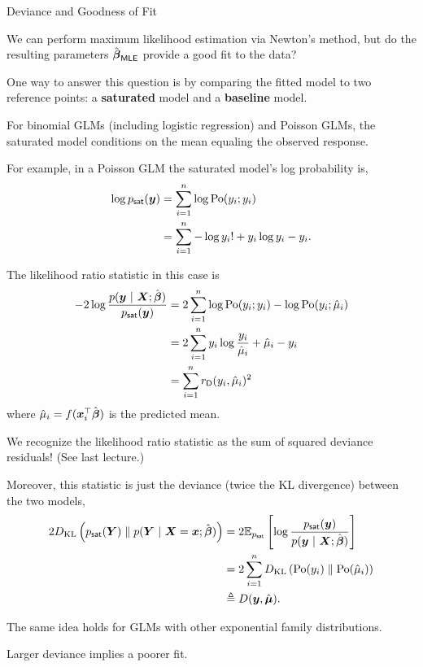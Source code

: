 \documentclass[aspectratio=169]{beamer}
\begin{document}
\begin{frame}[t,allowframebreaks]{Deviance and Goodness of
Fit}\label{deviance-and-goodness-of-fit}

We can perform maximum likelihood estimation via Newton's method, but do
the resulting parameters \(\hat{\boldsymbol{\beta}}_{\mathsf{MLE}}\) provide a good
fit to the data? 

One way to answer this question is by comparing the
fitted model to two reference points: a \textbf{saturated} model and a
\textbf{baseline} model.

For binomial GLMs (including logistic regression) and Poisson GLMs, the
saturated model conditions on the mean equaling the observed response.

For example, in a Poisson GLM the saturated model's log probability is,
\begin{align*}
\log p_{\mathsf{sat}}(\boldsymbol{y}) 
&= \sum_{i=1}^n \log \mathrm{Po}(y_i; y_i) \\
&= \sum_{i=1}^n -\log y_i! + y_i \log y_i - y_i.
\end{align*}

The likelihood ratio statistic in this case is \begin{align*}
-2 \log \frac{p(\boldsymbol{y} ~\vert~ \boldsymbol{X}; \hat{\boldsymbol{\beta}})}{p_{\mathsf{sat}}(\boldsymbol{y})} 
&= 2 \sum_{i=1}^n \log \mathrm{Po}(y_i; y_i) - \log \mathrm{Po}(y_i; \hat{\mu}_i)\\
&= 2 \sum_{i=1}^n y_i \log \frac{y_i}{\hat{\mu}_i} + \hat{\mu}_i - y_i \\
&= \sum_{i=1}^n r_{\mathsf{D}}(y_i, \hat{\mu}_i)^2
\end{align*} 
where \(\hat{\mu}_i = f(\boldsymbol{x}_i^\top \hat{\boldsymbol{\beta}})\) is the
predicted mean. 

We recognize the likelihood ratio statistic as the sum
of squared deviance residuals! (See last lecture.)

Moreover, this statistic is just the deviance (twice the KL divergence)
between the two models, \begin{align*}
2 D_{\textrm{KL}}\left(p_{\mathsf{sat}}(\boldsymbol{Y})\;\|\;p(\boldsymbol{Y} ~\vert~ \boldsymbol{X}=\boldsymbol{x}; \hat{\boldsymbol{\beta}})\right)
&= 2 \mathbb{E}_{p_{\mathsf{sat}}} \left[\log \frac{p_{\mathsf{sat}}(\boldsymbol{y})}{p(\boldsymbol{y} ~\vert~ \boldsymbol{X}; \hat{\boldsymbol{\beta}})} \right] \\
&= 2 \sum_{i=1}^n D_{\textrm{KL}}\left(\mathrm{Po}(y_i)\;\|\;\mathrm{Po}(\hat{\mu}_i)\right) \\
&\triangleq D(\boldsymbol{y}, \hat{\boldsymbol{\mu}}).
\end{align*} 

The same idea holds for GLMs with other exponential family
distributions. 

Larger deviance implies a poorer fit.
\end{frame}
\end{document}

